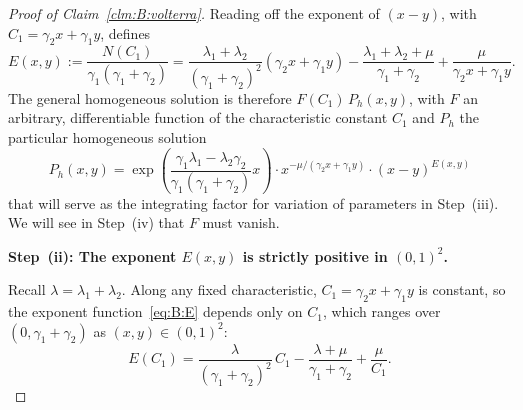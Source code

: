 \begin{proof}[Proof of Claim~\ref{clm:B:volterra}]
    Reading off the exponent of $(x-y)$, with $C_1=\gamma_2 x+\gamma_1 y$, defines
    \begin{equation}
        E(x,y) := \frac{N(C_1)}{\gamma_1(\gamma_1+\gamma_2)}
        = \frac{\lambda_1+\lambda_2}{(\gamma_1+\gamma_2)^2}(\gamma_2 x+\gamma_1 y)
        - \frac{\lambda_1+\lambda_2+\mu}{\gamma_1+\gamma_2}
        + \frac{\mu}{\gamma_2 x+\gamma_1 y}.
        \label{eq:B:E}
    \end{equation}
    The general homogeneous solution is therefore $F(C_1)\,P_h(x,y)$, with $F$ an arbitrary, differentiable function of the characteristic constant $C_1$ and $P_h$ the particular homogeneous solution
    \begin{equation}
        P_h(x,y) = \exp\!\left(\frac{\gamma_1\lambda_1-\lambda_2\gamma_2}{\gamma_1(\gamma_1+\gamma_2)}x\right)
        \cdot x^{-\mu/(\gamma_2 x+\gamma_1 y)}
        \cdot (x-y)^{E(x,y)}
        \label{eq:B:Ph}
    \end{equation}
    that will serve as the integrating factor for variation of parameters in Step~(iii). We will see in Step~(iv) that $F$ must vanish.
    
    
    \medskip\noindent\textbf{Step~(ii): The exponent $E(x,y)$ is strictly positive in $(0,1)^2$.}

    Recall $\lambda = \lambda_1+\lambda_2$. Along any fixed characteristic, $C_1 = \gamma_2 x + \gamma_1 y$ is constant, so the exponent function~\eqref{eq:B:E} depends only on $C_1$, which ranges over $(0,\gamma_1+\gamma_2)$ as $(x,y)\in(0,1)^2$:
    \begin{equation*}
        E(C_1) = 
        \frac{\lambda}{(\gamma_1+\gamma_2)^2}\,C_1
        - \frac{\lambda+\mu}{\gamma_1+\gamma_2}
        + \frac{\mu}{C_1}.
    \end{equation*}
    

\end{proof}
